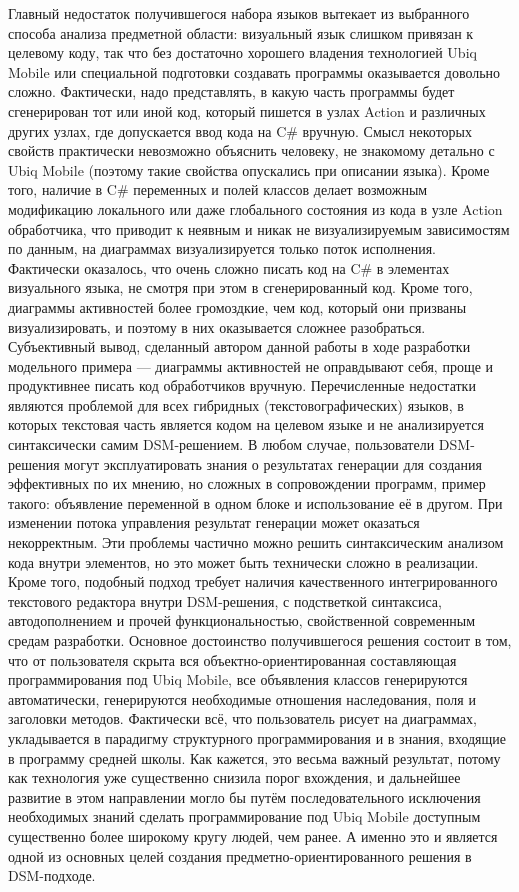 	Главный недостаток получившегося набора языков вытекает из выбранного способа анализа предметной области: визуальный язык слишком привязан к целевому коду, так что без достаточно хорошего владения технологией Ubiq Mobile или специальной подготовки создавать программы оказывается довольно сложно. Фактически, надо представлять, в какую часть программы будет сгенерирован тот или иной код, который пишется в узлах Action и различных других узлах, где допускается ввод кода на C# вручную. Смысл некоторых свойств практически невозможно объяснить человеку, не знакомому детально с Ubiq Mobile (поэтому такие свойства опускались при описании языка). Кроме того, наличие в C# переменных и полей классов делает возможным модификацию локального или даже глобального состояния из кода в узле Action обработчика, что приводит к неявным и никак не визуализируемым зависимостям по данным, на диаграммах визуализируется только поток исполнения. Фактически оказалось, что очень сложно писать код на C# в элементах визуального языка, не смотря при этом в сгенерированный код. Кроме того, диаграммы активностей более громоздкие, чем код, который они призваны визуализировать, и поэтому в них оказывается сложнее разобраться. Субъективный вывод, сделанный автором данной работы в ходе разработки модельного примера --- диаграммы активностей не оправдывают себя, проще и продуктивнее писать код обработчиков вручную.
	Перечисленные недостатки являются проблемой для всех гибридных (текстовографических) языков, в которых текстовая часть является кодом на целевом языке и не анализируется синтаксически самим DSM-решением. В любом случае, пользователи DSM-решения могут эксплуатировать знания о результатах генерации для создания эффективных по их мнению, но сложных в сопровождении программ, пример такого: объявление переменной в одном блоке и использование её в другом. При изменении потока управления результат генерации может оказаться некорректным. Эти проблемы частично можно решить синтаксическим анализом кода внутри элементов, но это может быть технически сложно в реализации. Кроме того, подобный подход требует наличия качественного интегрированного текстового редактора внутри DSM-решения, с подстветкой синтаксиса, автодополнением и прочей функциональностью, свойственной современным средам разработки.
	Основное достоинство получившегося решения состоит в том, что от пользователя скрыта вся объектно-ориентированная составляющая программирования под Ubiq Mobile, все объявления классов генерируются автоматически, генерируются необходимые отношения наследования, поля и заголовки методов. Фактически всё, что пользователь рисует на диаграммах, укладывается в парадигму структурного программирования и в знания, входящие в программу средней школы. Как кажется, это весьма важный результат, потому как технология уже существенно снизила порог вхождения, и дальнейшее развитие в этом направлении могло бы путём последовательного исключения необходимых знаний сделать программирование под Ubiq Mobile доступным существенно более широкому кругу людей, чем ранее. А именно это и является одной из основных целей создания предметно-ориентированного решения в DSM-подходе.
